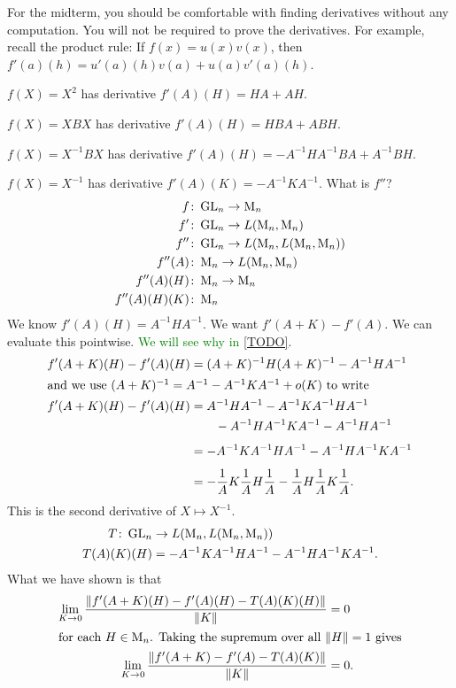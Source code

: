 For the midterm, you should be comfortable with finding derivatives without
any computation.
You will not be required to prove the derivatives.
For example, recall the product rule:
If $f(x) = u(x) v(x)$, then $f'(a)(h) = u'(a)(h) v(a) + u(a) v'(a)(h)$.
\begin{examples}
    \item $f(X) = X^2$ has derivative $f'(A)(H) = HA + AH$.
    \item $f(X) = XBX$ has derivative $f'(A)(H) = HBA + ABH$.
    \item $f(X) = X^{-1}BX$ has derivative
        $f'(A)(H) = -A^{-1}HA^{-1}BA + A^{-1}BH$.
    \item $f(X) = X^{-1}$ has derivative $f'(A)(K) = -A^{-1}KA^{-1}$.
        What is $f''$?
        \begin{align*}
            f&\colon \operatorname{GL}_n \to \operatorname{M}_n \\
            f'&\colon \operatorname{GL}_n \to L(\operatorname{M}_n, \operatorname{M}_n) \\
            f''&\colon \operatorname{GL}_n \to L(\operatorname{M}_n, L(\operatorname{M}_n, \operatorname{M}_n)) \\
            f''(A)&\colon \operatorname{M}_n \to L(\operatorname{M}_n, \operatorname{M}_n) \\
            f''(A)(H)&\colon \operatorname{M}_n \to \operatorname{M}_n \\
            f''(A)(H)(K)&\colon \operatorname{M}_n
        \end{align*}
        We know $f'(A)(H) = A^{-1}HA^{-1}$.
        We want $f'(A + K) - f'(A)$.
        We can evaluate this pointwise.
        \textcolor{Green}{We will see why in} \cref{TODO}.
        \begin{align*}
            f'(A+K)(H) - f'(A)(H)
                &= (A+K)^{-1}H(A+K)^{-1} - A^{-1}HA^{-1} \\
            \shortintertext{and we use
            $(A + K)^{-1} = A^{-1} - A^{-1}KA^{-1} + o(K)$ to write}
            f'(A+K)(H) - f'(A)(H)
                &= A^{-1} H A^{-1} - A^{-1}KA^{-1}HA^{-1} \\
                    &\qquad- A^{-1}HA^{-1}KA^{-1} - A^{-1}HA^{-1} \\[.4em]
                &= -A^{-1}KA^{-1}HA^{-1} -A^{-1}HA^{-1}KA^{-1} \\[.4em]
                &= -\frac1AK\frac1AH\frac1A -\frac1AH\frac1AK\frac1A.
        \end{align*}
        This is the second derivative of $X \mapsto X^{-1}$. \begin{align*}
            T\colon \operatorname{GL}_n &\to L(\operatorname{M}_n, L(\operatorname{M}_n, \operatorname{M}_n)) \\
            T(A)(K)(H) &= -A^{-1}KA^{-1}HA^{-1} - A^{-1}HA^{-1}KA^{-1}.
        \end{align*}
        What we have shown is that \begin{align*}
            \lim_{K \to 0} \frac{\lVert f'(A+K)(H) - f'(A)(H) - T(A)(K)(H)\rVert}
                {\lVert K\rVert} &= 0 \\
            \shortintertext{for each $H \in \operatorname{M}_n$.
            Taking the supremum over all $\lVert H\rVert = 1$ gives}
            \lim_{K \to 0} \frac{\lVert f'(A+K) - f'(A) - T(A)(K)\rVert}
                {\lVert K\rVert} &= 0.
        \end{align*}
\end{examples}
